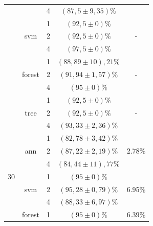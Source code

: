 \begin{table}[]
\begin{tabular}{|c|c|c|c|c|}
                      &                         & 4                & $ (87,5 \pm 9,35) \% $    &\\ \cline{2-5} 
                      & \multirow{3}{*}{svm}    & 1                & $ (92,5 \pm 0) \% $       & \multirow{3}{*}{-} \\ \cline{3-4} 
                      &                         & 2                & $ (92,5 \pm 0) \% $       &\\ \cline{3-4} 
                      &                         & 4                & $ (97,5 \pm 0) \% $       &\\ \cline{2-5} 
                      & \multirow{3}{*}{forest} & 1                & $ (88,89 \pm 10),21 \% $  & \multirow{3}{*}{-} \\ \cline{3-4} 
                      &                         & 2                & $ (91,94 \pm 1,57) \% $  & \\ \cline{3-4} 
                      &                         & 4                & $ (95 \pm 0) \% $         &\\ \cline{2-5} 
                      & \multirow{3}{*}{tree}   & 1                & $ (92,5 \pm 0) \% $       & \multirow{3}{*}{-} \\ \cline{3-4} 
                      &                         & 2                & $ (92,5 \pm 0) \% $       &\\ \cline{3-4} 
                      &                         & 4                & $ (93,33 \pm 2,36) \% $   &\\ \hline
\multirow{12}{*}{30}  & \multirow{3}{*}{ann}    & 1                & $ (82,78 \pm 3,42) \% $   & \multirow{3}{*}{2.78\%} \\ \cline{3-4} 
                      &                         & 2                & $ (87,22 \pm 2,19) \% $  & \\ \cline{3-4} 
                      &                         & 4                & $ (84,44 \pm 11),77 \% $  &\\ \cline{2-5} 
                      & \multirow{3}{*}{svm}    & 1                & $ (95 \pm 0) \% $        & \multirow{3}{*}{6.95\%} \\ \cline{3-4} 
                      &                         & 2                & $ (95,28 \pm 0,79) \% $   &\\ \cline{3-4} 
                      &                         & 4                & $ (88,33 \pm 6,97) \% $   &\\ \cline{2-5} 
                      & \multirow{3}{*}{forest} & 1                & $ (95 \pm 0) \%  $        & \multirow{3}{*}{6.39\%} \\ \cline{3-4} 

\end{tabular}
\end{table}
